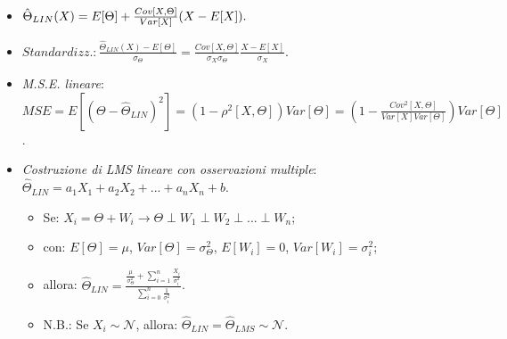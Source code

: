 \documentclass[8pt]{extarticle}
\begin{document}
\begin{multicols*}{3}
\begin{itemize}
              \begin{itemize}
                  \item $\hat{\Theta}_{LIN}(X)=E[\Theta]+\frac{Cov[X, \Theta]}{Var[X]}(X-E[X]). \newline \newline$
                  \item $Standardizz.: \frac{\hat{\Theta}_{LIN}(X)-E[\Theta]}{\sigma_{\Theta}}=\frac{Cov[X,\Theta]}{\sigma_{X}\sigma_{\Theta}}\frac{X-E[X]}{\sigma_{X}}$.
                  \item \textit{M.S.E. lineare}: $MSE=E[(\Theta-\hat{\Theta}_{LIN})^2]=(1-\rho^{2}[X,\Theta])Var[\Theta]=(1-\frac{Cov^{2}[X,\Theta]}{Var[X]Var[\Theta]})Var[\Theta]$.
                  \item \textit{Costruzione di LMS lineare con osservazioni multiple}: $\hat{\Theta}_{LIN}=a_{1}X_{1}+a_{2}X_{2}+...+a_{n}X_{n}+b$.
                        \begin{itemize}
                            \item Se: $X_{i}=\Theta + W_{i}\rightarrow \Theta\perp W_{1}\perp W_{2}\perp ...\perp W_{n}$;
                            \item con: $E[\Theta]=\mu$, $Var[\Theta]=\sigma^{2}_{\Theta}$, $E[W_{i}]=0$, $Var[W_{i}]=\sigma^{2}_{i}$;
                            \item allora: $\hat{\Theta}_{LIN}=\frac{\frac{\mu}{\sigma^{2}_{\Theta}}+\sum_{i=1}^{n}\frac{X_{i}}{\sigma^{2}_{i}}}{\sum_{i=0}^{n}\frac{1}{\sigma^{2}_{i}}}$.
                            \item N.B.: Se $X_{i}\sim\mathcal{N}$, allora: $\hat{\Theta}_{LIN}=\hat{\Theta}_{LMS}\sim\mathcal{N}$.
                        \end{itemize}
              \end{itemize}
    \end{itemize}


\end{multicols*}
\end{document}
